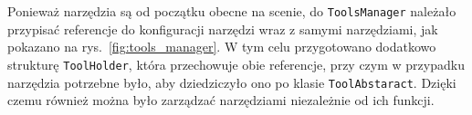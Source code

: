

Ponieważ narzędzia są od początku obecne na scenie, 
do \texttt{ToolsManager} należało przypisać referencje do konfiguracji narzędzi wraz z samymi narzędziami,
jak pokazano na rys.~\ref{fig:tools_manager}.
W tym celu przygotowano dodatkowo strukturę \texttt{ToolHolder},
która przechowuje obie referencje, przy czym w przypadku narzędzia potrzebne było,
aby dziedziczyło ono po klasie \texttt{ToolAbstaract}.
Dzięki czemu również można było zarządzać narzędziami niezależnie od ich funkcji.

